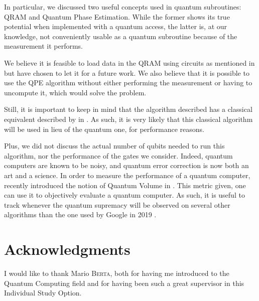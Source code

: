 \documentclass[11pt, a4paper]{article}
\begin{document}
        In particular, we discussed two useful concepts used in quantum subroutines: QRAM and Quantum Phase Estimation. While the former shows its true potential when implemented with a quantum access, the latter is, at our knowledge, not conveniently usable as a quantum subroutine because of the measurement it performs.
        
        We believe it is feasible to load data in the QRAM using circuits as mentioned in \cite{QRAMCircuit} but have chosen to let it for a future work. We also believe that it is possible to use the QPE algorithm without either performing the measurement or having to uncompute it, which would solve the problem.
        
        Still, it is important to keep in mind that the algorithm described has a classical equivalent described by \citeauthor{Dequantized} in \cite{Dequantized}. As such, it is very likely that this classical algorithm will be used in lieu of the quantum one, for performance reasons.
        
        Plus, we did not discuss the actual number of qubits needed to run this algorithm, nor the performance of the gates we consider. Indeed, quantum computers are known to be noisy, and quantum error correction is now both an art and a science. In order to measure the performance of a quantum computer, \citeauthor{QVolume} recently introduced the notion of Quantum Volume in \cite{QVolume}. This metric given, one can use it to objectively evaluate a quantum computer. As such, it is useful to track whenever the quantum supremacy will be observed on several other algorithms than the one used by Google in 2019 \cite{Supremacy}.
    
    \section{Acknowledgments}
        I would like to thank Mario \textsc{Berta}, both for having me introduced to the Quantum Computing field and for having been such a great supervisor in this Individual Study Option.

    \printbibliography
\end{document}
